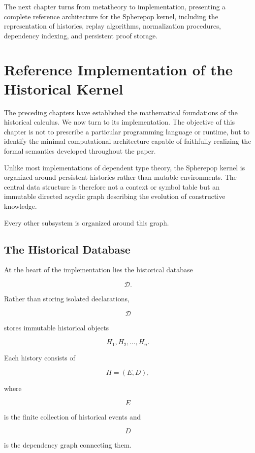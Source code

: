 \documentclass[12pt,oneside]{article}
\theoremstyle{definition}
\theoremstyle{remark}
\begin{document}
The next chapter turns from metatheory to implementation, presenting a complete
reference architecture for the Spherepop kernel, including the representation of
histories, replay algorithms, normalization procedures, dependency indexing, and
persistent proof storage.

\section{Reference Implementation of the Historical Kernel}

The preceding chapters have established the mathematical foundations of the
historical calculus. We now turn to its implementation. The objective of this
chapter is not to prescribe a particular programming language or runtime, but to
identify the minimal computational architecture capable of faithfully realizing
the formal semantics developed throughout the paper.

Unlike most implementations of dependent type theory, the Spherepop kernel is
organized around persistent histories rather than mutable environments. The
central data structure is therefore not a context or symbol table but an
immutable directed acyclic graph describing the evolution of constructive
knowledge.

Every other subsystem is organized around this graph.

\subsection{The Historical Database}

At the heart of the implementation lies the historical database

\[
\mathcal{D}.
\]

Rather than storing isolated declarations,

\[
\mathcal{D}
\]

stores immutable historical objects

\[
H_1,H_2,\ldots,H_n.
\]

Each history consists of

\[
H=(E,D),
\]

where

\[
E
\]

is the finite collection of historical events and

\[
D
\]

is the dependency graph connecting them.
\end{document}
